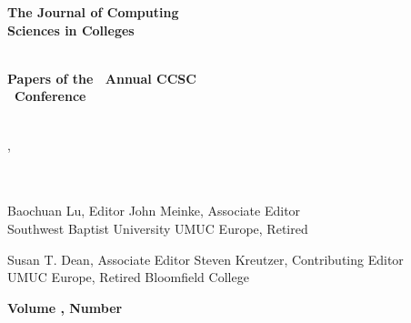 \begin{textsf}

\begin{center}
\textbf{\Huge{
The Journal of Computing\\
Sciences in Colleges\\
}}\\
\end{center}

\vspace{10pt}
\vspace{10pt}
\vspace{10pt}

\begin{center}
\textbf{\Large{
Papers of the \confOrdinal\ Annual CCSC\\
\confName\ Conference\\
}}\\
\end{center}

\vspace{10pt}

\begingroup
\centering
\large{\confDates, \confYear}\\
\large{\confSchool}\\
\large{\confCity}\\
\endgroup

\vfill

{\parindent0pt
Baochuan Lu, Editor \hfill John Meinke, Associate Editor\\
Southwest Baptist University \hfill UMUC Europe, Retired\\
}

\vspace{10pt}

{\parindent0pt
Susan T. Dean, Associate Editor \hfill Steven Kreutzer, Contributing Editor\\
UMUC Europe, Retired \hfill Bloomfield College\\
}

\vspace{10pt}

{\parindent0pt
\textbf{\Large Volume \journalVolume, Number \journalNumber} \hfill
\textbf{\Large \journalMonth\ \journalYear}\\
}
\end{textsf}
